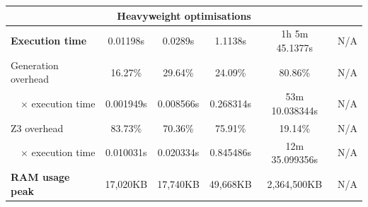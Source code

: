 \documentclass[english,runningheads]{llncs}
\begin{document}
\begin{table}[]
{\begin{tabular}{l||lllll}
\multicolumn{6}{c}{\textbf{Heavyweight optimisations}} \\ \hline \hline
\textbf{Execution time}                & \multicolumn{1}{c|}{0.01198s}   & \multicolumn{1}{c|}{0.0289s}   & \multicolumn{1}{c|}{1.1138s}   & \multicolumn{1}{c|}{1h 5m 45.1377s} & \multicolumn{1}{c}{\color[HTML]{888888} N/A} \\ \hline
Generation overhead                    & \multicolumn{1}{c|}{16.27\%}    & \multicolumn{1}{c|}{29.64\%}   & \multicolumn{1}{c|}{24.09\%}   & \multicolumn{1}{c|}{80.86\%}        & \multicolumn{1}{c}{\color[HTML]{888888} N/A} \\ \hline
\multicolumn{1}{r||}{× execution time} & \multicolumn{1}{c|}{0.001949s}  & \multicolumn{1}{c|}{0.008566s} & \multicolumn{1}{c|}{0.268314s} & \multicolumn{1}{c|}{53m 10.038344s} & \multicolumn{1}{c}{\color[HTML]{888888} N/A} \\ \hline
Z3 overhead                            & \multicolumn{1}{c|}{83.73\%}    & \multicolumn{1}{c|}{70.36\%}   & \multicolumn{1}{c|}{75.91\%}   & \multicolumn{1}{c|}{19.14\%}        & \multicolumn{1}{c}{\color[HTML]{888888} N/A} \\ \hline
\multicolumn{1}{r||}{× execution time} & \multicolumn{1}{c|}{0.010031s}  & \multicolumn{1}{c|}{0.020334s} & \multicolumn{1}{c|}{0.845486s} & \multicolumn{1}{c|}{12m 35.099356s} & \multicolumn{1}{c}{\color[HTML]{888888} N/A} \\ \hline
\textbf{RAM usage peak}                & \multicolumn{1}{c|}{17,020KB}   & \multicolumn{1}{c|}{17,740KB}  & \multicolumn{1}{c|}{49,668KB}  & \multicolumn{1}{c|}{2,364,500KB}    & \multicolumn{1}{c}{\color[HTML]{888888} N/A}
\end{tabular}
}
\end{table}
\end{document}
